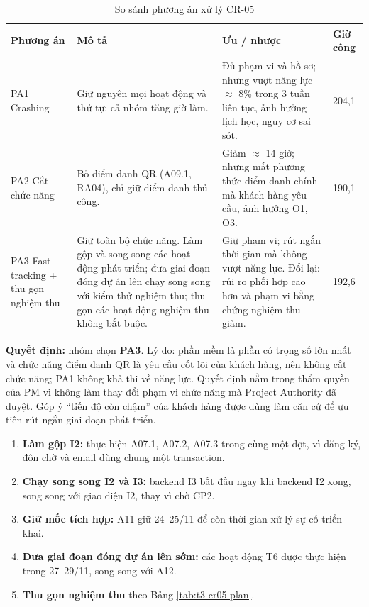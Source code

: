 \begin{table}[H]
\centering\small
\caption{So sánh phương án xử lý CR-05}\label{tab:t3-cr05-options}
\begin{tabularx}{\linewidth}{@{}p{.13\linewidth}XXp{.10\linewidth}@{}}
\toprule
\textbf{Phương án} & \textbf{Mô tả} & \textbf{Ưu / nhược} & \textbf{Giờ công}\\\midrule
PA1 \newline Crashing & Giữ nguyên mọi hoạt động và thứ tự; cả nhóm tăng giờ làm. & Đủ phạm vi và hồ sơ; nhưng vượt năng lực $\approx$ 8\% trong 3 tuần liên tục, ảnh hưởng lịch học, nguy cơ sai sót. & 204,1\\
PA2 \newline Cắt chức năng & Bỏ điểm danh QR (A09.1, RA04), chỉ giữ điểm danh thủ công. & Giảm $\approx$ 14 giờ; nhưng mất phương thức điểm danh chính mà khách hàng yêu cầu, ảnh hưởng O1, O3. & 190,1\\
PA3 \newline Fast-tracking + thu gọn nghiệm thu & Giữ toàn bộ chức năng. Làm gộp và song song các hoạt động phát triển; đưa giai đoạn đóng dự án lên chạy song song với kiểm thử nghiệm thu; thu gọn các hoạt động nghiệm thu không bắt buộc. & Giữ phạm vi; rút ngắn thời gian mà không vượt năng lực. Đổi lại: rủi ro phối hợp cao hơn và phạm vi bằng chứng nghiệm thu giảm. & 192,6\\
\bottomrule
\end{tabularx}
\end{table}

\noindent\textbf{Quyết định:} nhóm chọn \textbf{PA3}. Lý do: phần mềm là phần có trọng số lớn nhất và chức năng điểm danh QR là yêu cầu cốt lõi của khách hàng, nên không cắt chức năng; PA1 không khả thi về năng lực. Quyết định nằm trong thẩm quyền của PM vì không làm thay đổi phạm vi chức năng mà Project Authority đã duyệt. Góp ý ``tiến độ còn chậm'' của khách hàng được dùng làm căn cứ để ưu tiên rút ngắn giai đoạn phát triển.


\begin{enumerate}
    \item \textbf{Làm gộp I2:} thực hiện A07.1, A07.2, A07.3 trong cùng một đợt, vì đăng ký, đôn chờ và email dùng chung một transaction.
    \item \textbf{Chạy song song I2 và I3:} backend I3 bắt đầu ngay khi backend I2 xong, song song với giao diện I2, thay vì chờ CP2.
    \item \textbf{Giữ mốc tích hợp:} A11 giữ 24--25/11 để còn thời gian xử lý sự cố triển khai.
    \item \textbf{Đưa giai đoạn đóng dự án lên sớm:} các hoạt động T6 được thực hiện trong 27--29/11, song song với A12.
    \item \textbf{Thu gọn nghiệm thu} theo Bảng \ref{tab:t3-cr05-plan}.
\end{enumerate}

